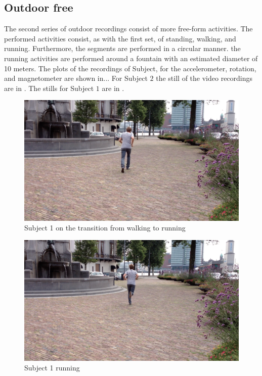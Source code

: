 \subsection{Outdoor free}\label{subsec:outdoor_free}
The second series of outdoor recordings consist of more free-form activities.
The performed activities consist, as with the first set, of standing, walking, and running.
Furthermore, the segments are performed in a circular manner.
\eg the running activities are performed around a fountain with an estimated diameter of 10 meters.
The plots of the recordings of Subject, for the accelerometer, rotation, and magnetometer are shown in...
For Subject $2$ the still of the video recordings are in .
The stills for Subject $1$ are in .


\begin{figure}
\centering
  \includegraphics[width=1\textwidth]{./Figures/chapter6/data_collection/stills/jos_cp_walk-run.png}
  \caption[Recording still 1]{Subject 1 on the transition from walking to running}
  \label{fig:data_gathering_still_1_still_walk_to_run}
\end{figure}

\begin{figure}
\centering
  \includegraphics[width=1\textwidth]{./Figures/chapter6/data_collection/stills/jos_run_2.png}
  \caption[Recording still 2]{Subject 1 running}
  \label{fig:data_gathering_still_1_running}
\end{figure}

